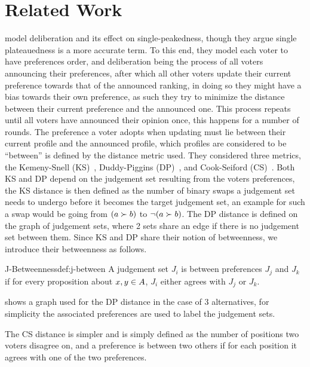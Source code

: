 \section{Related Work}
\label{section:related_work}
\citet{radDeliberationSinglePeakednessCoherent2021} model deliberation and its effect on single-peakedness, though they argue single plateauedness is a more accurate term. To this end, they model each voter to have preferences order, and deliberation being the process of all voters announcing their preferences, after which all other voters update their current preference towards that of the announced ranking, in doing so they might have a bias towards their own preference, as such they try to minimize the distance between their current preference and the announced one. This process repeats until all voters have announced their opinion once, this happens for a number of rounds. The preference a voter adopts when updating must lie between their current profile and the announced profile, which profiles are considered to be ``between'' is defined by the distance metric used. They considered three metrics, the Kemeny-Snell (KS)~\citep{kemeny1962preference}, Duddy-Piggins (DP)~\citep{duddyMeasureDistanceJudgment2012}, and Cook-Seiford (CS)~\citep{cookPriorityRankingConsensus1978}. Both KS and DP depend on the judgement set resulting from the voters preferences, the KS distance is then defined as the number of binary swaps a judgement set needs to undergo before it becomes the target judgement set, an example for such a swap would be going from $(a \succ b)$ to $\neg (a \succ b)$. The DP distance is defined on the graph of judgement sets, where 2 sets share an edge if there is no judgement set between them. Since KS and DP share their notion of betweenness, we introduce their betweenness as follows.

\begin{definition}{J-Betweenness}{def:j-between}
	A judgement set $J_i$ is between preferences $J_j$ and $J_k$ if for every proposition about $x,y \in A$, $J_i$ either agrees with $J_j$ or $J_k$.
\end{definition}

 shows a graph used for the DP distance in the case of 3 alternatives, for simplicity the associated preferences are used to label the judgement sets.


The CS distance is simpler and is simply defined as the number of positions two voters disagree on, and a preference is between two others if for each position it agrees with one of the two preferences.

